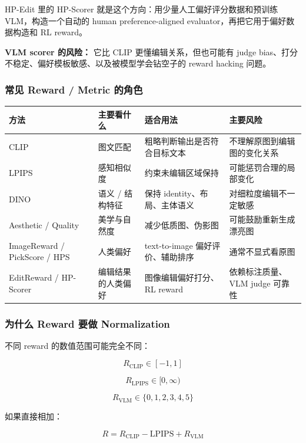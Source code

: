 HP-Edit 里的 HP-Scorer 就是这个方向：用少量人工偏好评分数据和预训练 VLM，构造一个自动的 human preference-aligned evaluator，再把它用于偏好数据构造和 RL reward。

\begin{warnbox}
\textbf{VLM scorer 的风险：} 它比 CLIP 更懂编辑关系，但也可能有 judge bias、打分不稳定、偏好模板敏感、以及被模型学会钻空子的 reward hacking 问题。
\end{warnbox}

\subsubsection{常见 Reward / Metric 的角色}

\begin{center}
{\small
\begin{tabular}{p{2.5cm}p{3.5cm}p{4.2cm}p{3.2cm}}
\hline
\textbf{方法} & \textbf{主要看什么} & \textbf{适合用法} & \textbf{主要风险} \\
\hline
CLIP
&
图文匹配
&
粗略判断输出是否符合目标文本
&
不理解原图到编辑图的变化关系
\\
LPIPS
&
感知相似度
&
约束未编辑区域保持
&
可能惩罚合理的局部变化
\\
DINO
&
语义 / 结构特征
&
保持 identity、布局、主体语义
&
对细粒度编辑不一定敏感
\\
Aesthetic / Quality
&
美学与自然度
&
减少低质图、伪影图
&
可能鼓励重新生成漂亮图
\\
ImageReward / PickScore / HPS
&
人类偏好
&
text-to-image 偏好评价、辅助排序
&
通常不显式看原图
\\
EditReward / HP-Scorer
&
编辑结果的人类偏好
&
图像编辑偏好打分、RL reward
&
依赖标注质量、VLM judge 可靠性
\\
\hline
\end{tabular}
}
\end{center}

\subsubsection{为什么 Reward 要做 Normalization}

不同 reward 的数值范围可能完全不同：

\[
R_\text{CLIP}\in[-1,1]
\]

\[
R_\text{LPIPS}\in[0,\infty)
\]

\[
R_\text{VLM}\in\{0,1,2,3,4,5\}
\]

如果直接相加：

\[
R
=
R_\text{CLIP}
-
\text{LPIPS}
+
R_\text{VLM}
\]

